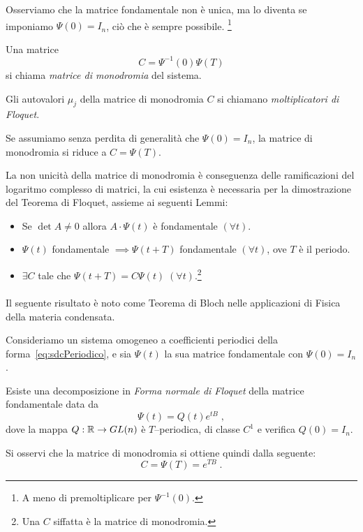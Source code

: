 Osserviamo che la matrice fondamentale non è unica, ma lo diventa se imponiamo $\Psi(0)=I_n$, ciò
che è sempre possibile.
\footnote{A meno di premoltiplicare per $\Psi^{-1} (0)$.}

\begin{definizione}
    Una matrice
    $$C= \Psi^{-1} (0) \Psi (T) $$
    si chiama \emph{matrice di monodromia} del sistema.

    Gli autovalori $\mu_j$ della matrice di monodromia $C$ si chiamano \emph{moltiplicatori di Floquet}.
\end{definizione}

Se assumiamo senza perdita di generalità che $\Psi (0) = I_n$, la matrice di monodromia si riduce a $C= \Psi (T)$.

La non unicità della matrice di monodromia è conseguenza delle ramificazioni del logaritmo complesso
di matrici, la cui esistenza è necessaria per la dimostrazione del Teorema di Floquet, assieme ai
seguenti Lemmi:
\begin{itemize}
    \item Se $\det A \neq 0$ allora $A \cdot \Psi (t)$ è fondamentale $(\forall t)$.
    \item $\Psi (t)$ fondamentale $\implies \Psi (t+T)$ fondamentale $(\forall t)$, ove $T$ è il periodo.
    \item $\exists C$ tale che $\Psi (t+T) = C \Psi (t) \; (\forall t)$.\footnote{Una $C$ siffatta è la matrice di monodromia.}
\end{itemize}

\paragraph{}
Il seguente risultato è noto come Teorema di Bloch nelle applicazioni di Fisica della materia condensata.

\begin{teorema}[di Floquet]
    Consideriamo un sistema omogeneo a coefficienti periodici della forma~\eqref{eq:sdcPeriodico}, e
    sia $\Psi (t)$ la sua matrice fondamentale con $\Psi (0) = I_n$.

    Esiste una decomposizione in \emph{Forma normale di Floquet} della matrice fondamentale data da
    $$\Psi (t) = Q(t) e^{tB} \; ,$$
    dove la mappa $Q : \mathbb{R} \rightarrow GL(n)$ è $T$--periodica, di classe $C^1$ e verifica $Q(0) = I_n$.
    \label{teo:floquet}
\end{teorema}
Si osservi che la matrice di monodromia si ottiene quindi dalla seguente:
$$C= \Psi (T) = e^{TB} \; .$$

